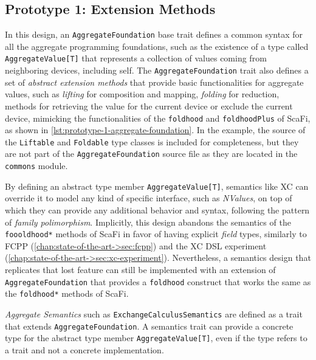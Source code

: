 \subsection{Prototype 1: Extension Methods} \label{chap:design->sec:dsl->subsec:prototype-1-extension-methods}

In this design, an \texttt{AggregateFoundation} base trait defines a common syntax for all the aggregate programming foundations, such as the existence of a type called \texttt{AggregateValue[T]} that represents a collection of values coming from neighboring devices, including self.
%
The \texttt{AggregateFoundation} trait also defines a set of \textit{abstract extension methods} that provide basic functionalities for aggregate values, such as \textit{lifting} for composition and mapping, \textit{folding} for reduction, methods for retrieving the value for the current device or exclude the current device, mimicking the functionalities of the \texttt{foldhood} and \texttt{foldhoodPlus} of ScaFi, as shown in \cref{lst:prototype-1-aggregate-foundation}.
%
In the example, the source of the \texttt{Liftable} and \texttt{Foldable} type classes is included for completeness, but they are not part of the \texttt{AggregateFoundation} source file as they are located in the \texttt{commons} module.



By defining an abstract type member \texttt{AggregateValue[T]}, semantics like \ac{XC} can override it to model any kind of specific interface, such as \textit{NValues}, on top of which they can provide any additional behavior and syntax, following the pattern of \textit{family polimorphism}.
%
Implicitly, this design abandons the  semantics of the \texttt{foooldhood*} methods of ScaFi in favor of having explicit \textit{field} types, similarly to FCPP (\cref{chap:state-of-the-art->sec:fcpp}) and the \ac{XC} \ac{DSL} experiment (\cref{chap:state-of-the-art->sec:xc-experiment}).
%
Nevertheless, a semantics design that replicates that lost feature can still be implemented with an extension of \texttt{AggregateFoundation} that provides a \texttt{foldhood} construct that works the same as the \texttt{foldhood*} methods of ScaFi.

\textit{Aggregate Semantics} such as \texttt{ExchangeCalculusSemantics} are defined as a trait that extends \texttt{AggregateFoundation}.
%
A semantics trait can provide a concrete type for the abstract type member \texttt{AggregateValue[T]}, even if the type refers to a trait and not a concrete implementation.

